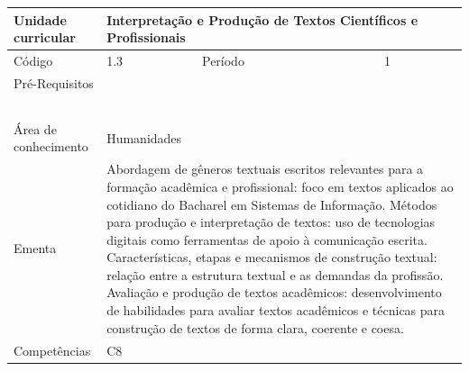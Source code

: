 \clearpage
\newpage

\begin{quadro}[ht!]
  \centering\scriptsize
\caption{Unidade Curricular Interpretação e Produção de Textos Científicos e Profissionais}

\begin{tabular}{|p{2.5cm}|p{2.5cm}|p{2.5cm}|p{2.5cm}|p{2.5cm}|}\hline

  Unidade curricular & \multicolumn{4}{p{10cm}|}{ Interpretação e Produção de Textos Científicos e Profissionais }\\\hline
  Código & 1.3 & Período & \multicolumn{2}{p{5cm}|}{ 1 }\\\hline
  Pré-Requisitos & \multicolumn{4}{p{10cm}|}{  } \\\hline
  \cellcolor{blue1}{ CH PRESENCIAL } &
    \cellcolor{blue1}{CH EAD Síncrona} &
    \cellcolor{blue1}{CH EAD Síncrona Mediada} &
    \cellcolor{blue1}{CH EAD Assíncrona} &
    \cellcolor{blue1}{CH APCC} \\\hline
  \cellcolor{blue1}{ 30 } &
    \cellcolor{blue1}{ 0 } &
    \cellcolor{blue1}{ 0 } &
    \cellcolor{blue1}{ 0 } &
    \cellcolor{blue1}{0} \\\hline
  \cellcolor{blue1}{ CH Teórica } &
    \cellcolor{blue1}{CH Prática} &
    \cellcolor{blue1}{CH Humanidades} &
    \cellcolor{blue1}{CH Extensão} &
    \cellcolor{blue1}{CH EAD TOTAL} \\\hline
  \cellcolor{blue1}{ 15 } &
    \cellcolor{blue1}{ 15 } &
    \cellcolor{blue1}{ 30 } &
    \cellcolor{blue1}{ 0 } &
    \cellcolor{blue1}{ 0 } \\\hline
  \cellcolor{blue1}{CARGA-HORÁRIA TOTAL} & \multicolumn{4}{p{10cm}|}{ \cellcolor{blue1}{ 30 } } \\\hline
  Área de conhecimento & \multicolumn{4}{p{10cm}|}{ Humanidades } \\\hline
  Ementa & \multicolumn{4}{p{10cm}|}{ Abordagem de gêneros textuais escritos relevantes para a formação acadêmica e profissional: foco em textos aplicados ao cotidiano do Bacharel em Sistemas de Informação. Métodos para produção e interpretação de textos: uso de tecnologias digitais como ferramentas de apoio à comunicação escrita. Características, etapas e mecanismos de construção textual: relação entre a estrutura textual e as demandas da profissão. Avaliação e produção de textos acadêmicos: desenvolvimento de habilidades para avaliar textos acadêmicos e técnicas para construção de textos de forma clara, coerente e coesa. } \\\hline
  Competências & \multicolumn{4}{p{10cm}|}{ C8 } \\\hline


  
	\end{tabular}

\end{quadro}


